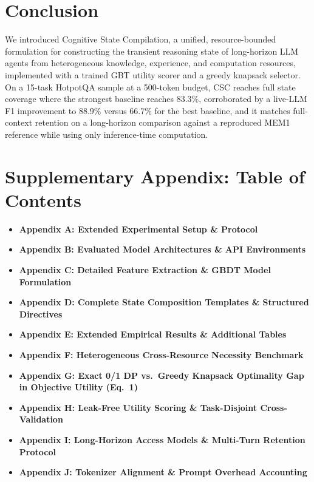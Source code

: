 \documentclass{article}
\begin{document}
\section{Conclusion}

We introduced Cognitive State Compilation, a unified, resource-bounded formulation for constructing the transient reasoning state of long-horizon LLM agents from heterogeneous knowledge, experience, and computation resources, implemented with a trained GBT utility scorer and a greedy knapsack selector. On a 15-task HotpotQA sample at a 500-token budget, CSC reaches full state coverage where the strongest baseline reaches 83.3\%, corroborated by a live-LLM F1 improvement to 88.9\% versus 66.7\% for the best baseline, and it matches full-context retention on a long-horizon comparison against a reproduced MEM1 reference while using only inference-time computation.




\clearpage
\appendix

\section*{Supplementary Appendix: Table of Contents}

\begin{itemize}
    \item \textbf{Appendix A: Extended Experimental Setup \& Protocol}
    \item \textbf{Appendix B: Evaluated Model Architectures \& API Environments}
    \item \textbf{Appendix C: Detailed Feature Extraction \& GBDT Model Formulation}
    \item \textbf{Appendix D: Complete State Composition Templates \& Structured Directives}
    \item \textbf{Appendix E: Extended Empirical Results \& Additional Tables}
    \item \textbf{Appendix F: Heterogeneous Cross-Resource Necessity Benchmark}
    \item \textbf{Appendix G: Exact 0/1 DP vs.\ Greedy Knapsack Optimality Gap in Objective Utility (Eq.~1)}
    \item \textbf{Appendix H: Leak-Free Utility Scoring \& Task-Disjoint Cross-Validation}
    \item \textbf{Appendix I: Long-Horizon Access Models \& Multi-Turn Retention Protocol}
    \item \textbf{Appendix J: Tokenizer Alignment \& Prompt Overhead Accounting}
\end{itemize}
\end{document}
